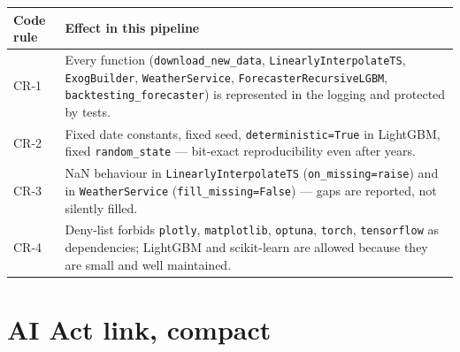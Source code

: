 \documentclass[
  english,
  letterpaper,
]{scrbook}
\newcounter{none} %
\begin{document}
{\def\LTcaptype{none} %
\begin{longtable}[]{@{}
  >{\centering\arraybackslash}p{}
  >{\raggedright\arraybackslash}p{}@{}}
\toprule\noalign{}
\begin{minipage}[b]{\linewidth}\centering
Code rule
\end{minipage} & \begin{minipage}[b]{\linewidth}\raggedright
Effect in this pipeline
\end{minipage} \\
\midrule\noalign{}
\endhead
\bottomrule\noalign{}
\endlastfoot
CR-1 & Every function (\texttt{download\_new\_data},
\texttt{LinearlyInterpolateTS}, \texttt{ExogBuilder},
\texttt{WeatherService}, \texttt{ForecasterRecursiveLGBM},
\texttt{backtesting\_forecaster}) is represented in the logging and
protected by tests. \\
CR-2 & Fixed date constants, fixed seed, \texttt{deterministic=True} in
LightGBM, fixed \texttt{random\_state} --- bit-exact reproducibility
even after years. \\
CR-3 & NaN behaviour in \texttt{LinearlyInterpolateTS}
(\texttt{on\_missing=\textquotesingle{}raise\textquotesingle{}}) and in
\texttt{WeatherService} (\texttt{fill\_missing=False}) --- gaps are
reported, not silently filled. \\
CR-4 & Deny-list forbids \texttt{plotly}, \texttt{matplotlib},
\texttt{optuna}, \texttt{torch}, \texttt{tensorflow} as dependencies;
LightGBM and scikit-learn are allowed because they are small and well
maintained. \\
\end{longtable}
}

\section{AI Act link, compact}\label{ai-act-link-compact}
\end{document}
